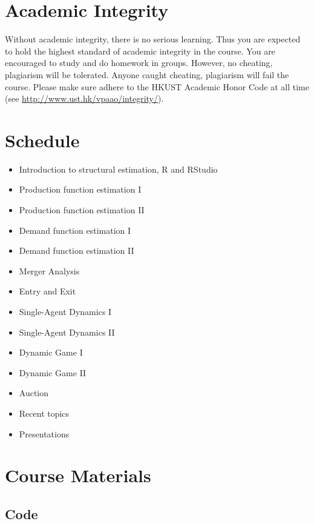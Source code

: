 \documentclass[
]{book}
\providecommand{\tightlist}{%
  \setlength{\itemsep}{0pt}\setlength{\parskip}{0pt}}
\begin{document}
\hypertarget{academic-integrity}{%
\section{Academic Integrity}\label{academic-integrity}}

Without academic integrity, there is no serious learning. Thus you are expected to hold the highest standard of academic integrity in the course. You are encouraged to study and do homework in groups. However, no cheating, plagiarism will be tolerated. Anyone caught
cheating, plagiarism will fail the course. Please make sure adhere to the HKUST Academic
Honor Code at all time (see \url{http://www.ust.hk/vpaao/integrity/}).

\hypertarget{schedule}{%
\section{Schedule}\label{schedule}}

\begin{itemize}
\tightlist
\item
  Introduction to structural estimation, R and RStudio
\item
  Production function estimation I
\item
  Production function estimation II
\item
  Demand function estimation I
\item
  Demand function estimation II
\item
  Merger Analysis
\item
  Entry and Exit
\item
  Single-Agent Dynamics I
\item
  Single-Agent Dynamics II
\item
  Dynamic Game I
\item
  Dynamic Game II
\item
  Auction
\item
  Recent topics
\item
  Presentations
\end{itemize}

\hypertarget{course-materials}{%
\section{Course Materials}\label{course-materials}}

\hypertarget{code}{%
\subsection{Code}\label{code}}
\end{document}
